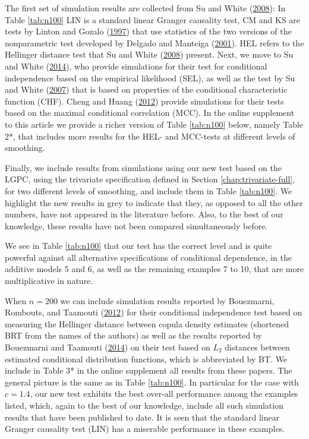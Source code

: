 \documentclass[
  12pt,
  letterpaper]{article}
\theoremstyle{definition}
\theoremstyle{definition}
\theoremstyle{definition}
\theoremstyle{remark}
\begin{document}
The first set of simulation results are collected from Su and White (\protect\hyperlink{ref-su2008nonparametric}{2008}): In Table \ref{tab:n100} LIN is a standard linear Granger causality test, CM and KS are tests by Linton and Gozalo (\protect\hyperlink{ref-linton1997conditional}{1997}) that use statistics of the two versions of the nonparametric test developed by Delgado and Manteiga (\protect\hyperlink{ref-delgado2001significance}{2001}). HEL refers to the Hellinger distance test that Su and White (\protect\hyperlink{ref-su2008nonparametric}{2008}) present. Next, we move to Su and White (\protect\hyperlink{ref-su2014testing}{2014}), who provide simulations for their test for conditional independence based on the empirical likelihood (SEL), as well as the test by Su and White (\protect\hyperlink{ref-su2007consistent}{2007}) that is based on properties of the conditional characteristic function (CHF). Cheng and Huang (\protect\hyperlink{ref-cheng2012conditional}{2012}) provide simulations for their tests based on the maximal conditional correlation (MCC). In the online supplement to this article we provide a richer version of Table \ref{tab:n100} below, namely Table 2*, that includes more results for the HEL- and MCC-tests at different levels of smoothing.



Finally, we include results from simulations using our new test based on the LGPC, using the trivariate specification defined in Section \ref{chap:trivariate-full}, for two different levels of smoothing, and include them in Table \ref{tab:n100}. We highlight the new results in grey to indicate that they, as opposed to all the other numbers, have not appeared in the literature before. Also, to the best of our knowledge, these results have not been compared simultaneously before.

We see in Table \ref{tab:n100} that our test has the correct level and is quite powerful against all alternative specifications of conditional dependence, in the additive models 5 and 6, as well as the remaining examples 7 to 10, that are more multiplicative in nature.

When \(n=200\) we can include simulation results reported by Bouezmarni, Rombouts, and Taamouti (\protect\hyperlink{ref-bouezmarni2012nonparametric}{2012}) for their conditional independence test based on measuring the Hellinger distance between copula density estimates (shortened BRT from the names of the authors) as well as the results reported by Bouezmarni and Taamouti (\protect\hyperlink{ref-boue:taam:2014}{2014}) on their test based on \(L_2\) distances between estimated conditional distribution functions, which is abbreviated by BT. We include in Table 3* in the online supplement all results from these papers. The general picture is the same as in Table \ref{tab:n100}. In particular for the case with \(c=1.4\), our new test exhibits the best over-all performance among the examples listed, which, again to the best of our knowledge, include all such simulation results that have been published to date. It is seen that the standard linear Granger causality test (LIN) has a miserable performance in these examples.
\end{document}
